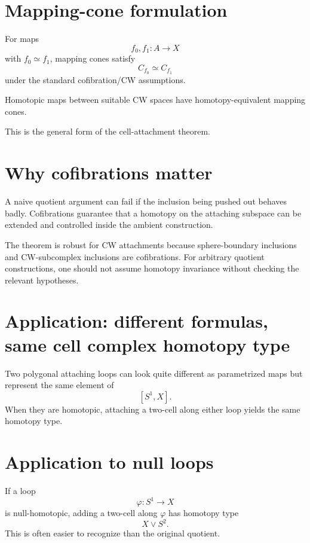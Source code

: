 \section{Mapping-cone formulation}

For maps
\[
f_0,f_1:A\to X
\]
with \(f_0\simeq f_1\), mapping cones satisfy
\[
C_{f_0}\simeq C_{f_1}
\]
under the standard cofibration/CW assumptions.

\begin{theorem}
\label{thm:viii08-cones}
Homotopic maps between suitable CW spaces have homotopy-equivalent mapping
cones.
\end{theorem}

This is the general form of the cell-attachment theorem.

\section{Why cofibrations matter}

A naive quotient argument can fail if the inclusion being pushed out behaves
badly.  Cofibrations guarantee that a homotopy on the attaching subspace can be
extended and controlled inside the ambient construction.

\begin{warning}
\label{warn:viii08-cofibration}
The theorem is robust for CW attachments because sphere-boundary inclusions and
CW-subcomplex inclusions are cofibrations.  For arbitrary quotient
constructions, one should not assume homotopy invariance without checking the
relevant hypotheses.
\end{warning}

\section{Application: different formulas, same cell complex homotopy type}

Two polygonal attaching loops can look quite different as parametrized maps but
represent the same element of
\[
[S^1,X].
\]
When they are homotopic, attaching a two-cell along either loop yields the same
homotopy type.

\section{Application to null loops}

If a loop
\[
\varphi:S^1\to X
\]
is null-homotopic, adding a two-cell along \(\varphi\) has homotopy type
\[
X\vee S^2.
\]
This is often easier to recognize than the original quotient.

